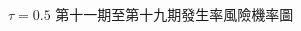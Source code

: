 \documentclass[12pt,a4paper]{article}
\begin{document}
\begin{CJK}{UTF8}{bkai}
\begin{figure}[htpb]
\caption{$\tau = 0.5$ 第十一期至第十九期發生率風險機率圖}
\label{Fig.main10}
\end{figure}


\end{CJK}
\end{document}
